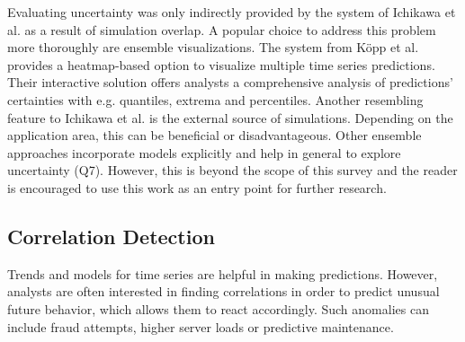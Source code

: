 \documentclass[electronic]{vgtc}             %
\begin{document}
Evaluating uncertainty was only indirectly provided by the system of Ichikawa et al. \cite{ichikawa:2002} as a result of simulation overlap.
A popular choice to address this problem more thoroughly are ensemble visualizations.
The system from K\"opp et al. \cite{koepp:2014} provides a heatmap-based option to visualize multiple time series predictions. 
Their interactive solution offers analysts a comprehensive analysis of predictions' certainties with e.g. quantiles, extrema and percentiles. 
Another resembling feature to Ichikawa et al. \cite{ichikawa:2002} is the external source of simulations. 
Depending on the application area, this can be beneficial or disadvantageous. 
Other ensemble approaches incorporate models explicitly and help in general to explore uncertainty (Q7).
However, this is beyond the scope of this survey and the reader is encouraged to use this work as an entry point for further research. 


\subsection{Correlation Detection\label{subsec:correlation}}
Trends and models for time series are helpful in making predictions.  
However, analysts are often interested in finding correlations in order to predict unusual future behavior, which allows them to react accordingly. 
Such anomalies can include fraud attempts, higher server loads or predictive maintenance.
\end{document}
